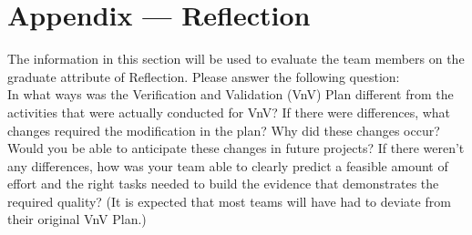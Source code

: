 \documentclass[12pt, titlepage]{article}
\begin{document}
\newpage

\section{Appendix --- Reflection}

The information in this section will be used to evaluate the team members on the
graduate attribute of Reflection.  Please answer the following question:\\
\noindent
In what ways was the Verification and Validation (VnV) Plan different
  from the activities that were actually conducted for VnV?  If there were
  differences, what changes required the modification in the plan?  Why did
  these changes occur?  Would you be able to anticipate these changes in future
  projects?  If there weren't any differences, how was your team able to clearly
  predict a feasible amount of effort and the right tasks needed to build the
  evidence that demonstrates the required quality?  (It is expected that most
  teams will have had to deviate from their original VnV Plan.)
\end{document}
